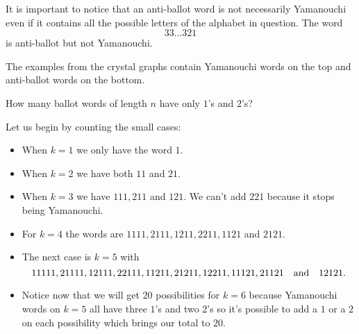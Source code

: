\documentclass[12pt]{memoir}
\begin{document}
\begin{Rmk}
It is important to notice that an anti-ballot word is not necessarily Yamanouchi even if it contains all the possible letters of the alphabet in question. The word 
$$33\dots 321$$
is anti-ballot but not Yamanouchi.\par 
The examples from the crystal graphs contain Yamanouchi words on the top and anti-ballot words on the bottom.
\end{Rmk}

\begin{Ej}[Exercise 7]
    How many ballot words of length $n$ have only $1$'s and $2$'s?
\end{Ej}

\begin{ptcbr}
    Let us begin by counting the small cases:
    \begin{itemize}
        \itemsep=-0.4em
        \item When $k=1$ we only have the word $1$. 
        \item When $k=2$ we have both $11$ and $21$. 
        \item When $k=3$ we have $111,211$ and $121$. We can't add $221$ because it stops being Yamanouchi.
        \item For $k=4$ the words are $1111,2111,1211,2211,1121$ and $2121$. 
        \item The next case is $k=5$ with 
        $$11111,21111,12111,22111,11211,21211,12211,11121,21121\quad\text{and}\quad12121.$$
        \item Notice now that we will get $20$ possibilities for $k=6$ because Yamanouchi words on $k=5$ all have three $1$'s and two $2$'s so it's possible to add a $1$ or a $2$ on each possibility which brings our total to $20$.
     \end{itemize}
\end{ptcbr}
\end{document}
